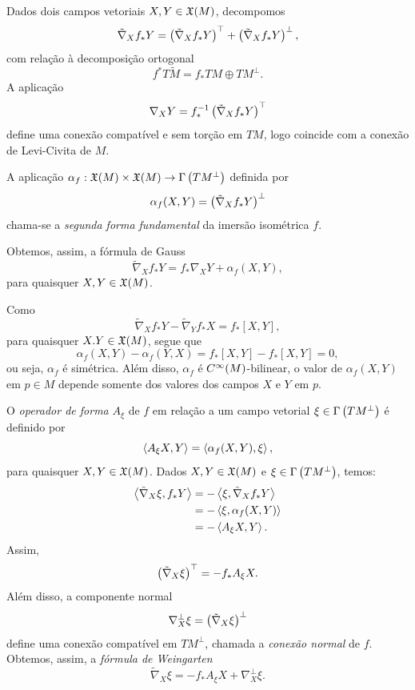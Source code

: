 Dados dois campos vetoriais $X,Y \in \mathfrak{X}(M)$, decompomos
\[ \tilde{\nabla}_X f_* Y = \left( \tilde{\nabla}_X f_* Y \right)^\top + \left( \tilde{\nabla}_X f_* Y \right)^\perp, \]
com relação à decomposição ortogonal
\[ f^* T \tilde{M} = f_* TM \oplus TM^\perp. \]
A aplicação
\[ \nabla_X Y = f_*^{-1} \left( \tilde{\nabla}_X f_* Y \right)^\top \]
define uma conexão compatível e sem torção em $TM$, logo coincide com a conexão de Levi-Civita de $M$.

\begin{definicao}
	A aplicação $\alpha_f: \mathfrak{X}(M) \times \mathfrak{X}(M) \rightarrow \Gamma \left( TM^\perp \right)$ definida por
	\[ \alpha_f (X,Y) = \left( \tilde{\nabla}_X f_* Y \right)^\perp \]
	chama-se a \emph{segunda forma fundamental} da imersão isométrica $f$.
\end{definicao}

Obtemos, assim, a fórmula de Gauss
\[ \tilde{\nabla}_X f_* Y = f_* \nabla_X Y + \alpha_f (X,Y), \]
para quaisquer $X, Y \in \mathfrak{X}(M)$.

\begin{observacao}
	Como
	\[ \tilde{\nabla}_X f_* Y - \tilde{\nabla}_Y f_* X = f_* [X,Y], \]
	para quaisquer $X.Y \in \mathfrak{X}(M)$, segue que
	\[ \alpha_f (X,Y) - \alpha_f(Y,X) = f_* [X,Y] - f_* [X,Y] = 0, \]
	ou seja, $\alpha_f$ é simétrica. Além disso, $\alpha_f$ é $C^\infty(M)$-bilinear, o valor de $\alpha_f (X,Y)$ em $p \in M$ depende somente dos valores dos campos $X$ e $Y$ em $p$.
\end{observacao}

O \emph{operador de forma} $A_\xi$ de $f$ em relação a um campo vetorial $\xi \in \Gamma \left( TM^\perp \right)$ é definido por
\[ \left\langle A_\xi X,Y \right\rangle = \left\langle \alpha_f (X,Y),\xi \right\rangle, \]
para quaisquer $X,Y \in \mathfrak{X}(M)$. Dados $X,Y \in \mathfrak{X}(M)$ e $\xi \in \Gamma \left( TM^\perp \right)$, temos:
\begin{align*}
	\left\langle \tilde{\nabla}_X \xi,f_* Y \right\rangle &= - \left\langle \xi,\tilde{\nabla}_X f_* Y \right\rangle\\
	&= -\left\langle \xi,\alpha_f (X,Y) \right\rangle\\
	&= -\left\langle A_\xi X,Y \right\rangle.
\end{align*}
Assim,
\[ \left( \tilde{\nabla}_X \xi \right)^\top  = -f_* A_\xi X. \]
Além disso, a componente normal
\[ \nabla^\perp_X \xi = \left( \tilde{\nabla}_X \xi \right)^\perp \]
define uma conexão compatível em $TM^\perp$, chamada a \emph{conexão normal} de $f$. Obtemos, assim, a \emph{fórmula de Weingarten}
\[ \tilde{\nabla}_X \xi = - f_* A_\xi X + \nabla^\perp_X \xi. \]


